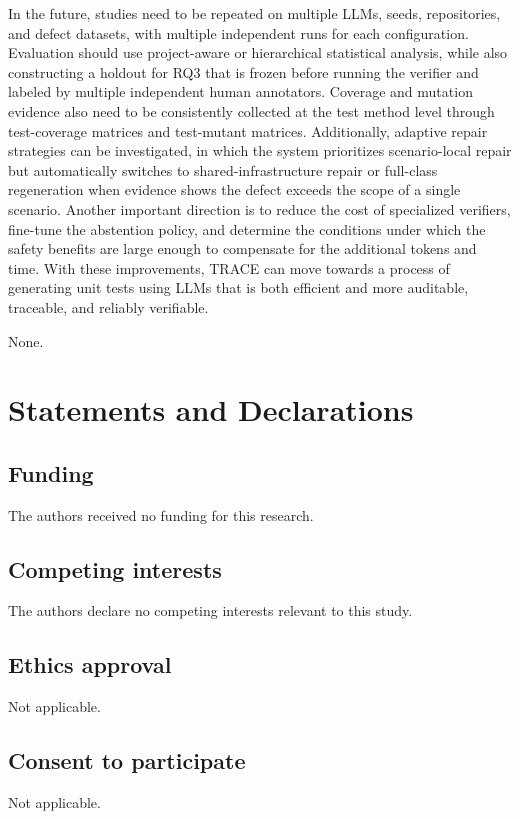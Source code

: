 \documentclass[pdflatex,sn-basic,Numbered,iicol]{sn-jnl}
\begin{document}
In the future, studies need to be repeated on multiple LLMs, seeds, repositories, and defect datasets, with multiple independent runs for each configuration. Evaluation should use project-aware or hierarchical statistical analysis, while also constructing a holdout for RQ3 that is frozen before running the verifier and labeled by multiple independent human annotators. Coverage and mutation evidence also need to be consistently collected at the test method level through test-coverage matrices and test-mutant matrices. Additionally, adaptive repair strategies can be investigated, in which the system prioritizes scenario-local repair but automatically switches to shared-infrastructure repair or full-class regeneration when evidence shows the defect exceeds the scope of a single scenario. Another important direction is to reduce the cost of specialized verifiers, fine-tune the abstention policy, and determine the conditions under which the safety benefits are large enough to compensate for the additional tokens and time. With these improvements, TRACE can move towards a process of generating unit tests using LLMs that is both efficient and more auditable, traceable, and reliably verifiable.

\backmatter

None.

\section*{Statements and Declarations}

\subsection*{Funding}
The authors received no funding for this research.

\subsection*{Competing interests}
The authors declare no competing interests relevant to this study.

\subsection*{Ethics approval}
Not applicable.

\subsection*{Consent to participate}
Not applicable.
\end{document}
